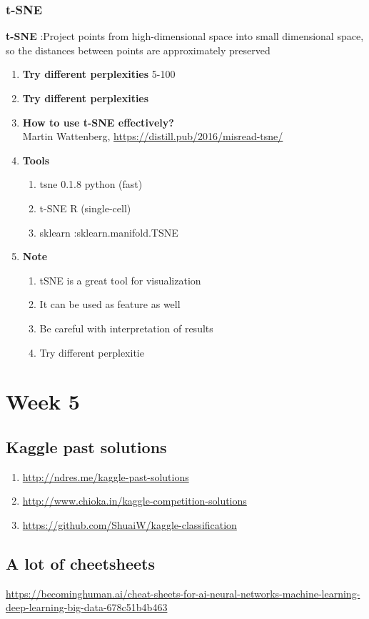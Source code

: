 \documentclass[11pt, twoside]{article}   	%
\begin{document}
\subsubsection{t-SNE}
\textbf{t-SNE} :Project points from high-dimensional space into small dimensional space, so the distances between points are approximately preserved 
\begin{enumerate}

    \item \textbf{Try different perplexities} 5-100
    \item \textbf{Try different perplexities}
    \item  \textbf{How to use t-SNE effectively?}
   \\Martin Wattenberg, \url{https://distill.pub/2016/misread-tsne/}
     \item \textbf{Tools}
         \begin{enumerate}
        \item tsne 0.1.8 python (fast)
        \item t-SNE R (single-cell)
         \item sklearn :sklearn.manifold.TSNE
          \end{enumerate}
       \item \textbf{Note}
     \begin{enumerate}
        \item tSNE is a great tool for visualization
        \item It can be used as feature as well
        \item Be careful with interpretation of results
        \item Try different perplexitie
       \end{enumerate}

 
  \end{enumerate}

\pagebreak
\section{Week 5}
\subsection{Kaggle past solutions}
\begin{enumerate}
    \item \url{http://ndres.me/kaggle-past-solutions}
    \item \url{http://www.chioka.in/kaggle-competition-solutions}
    \item \url{https://github.com/ShuaiW/kaggle-classification}
 \end{enumerate}    

\subsection{A lot of cheetsheets}
\url{https://becominghuman.ai/cheat-sheets-for-ai-neural-networks-machine-learning-deep-learning-big-data-678c51b4b463}
\end{document}
